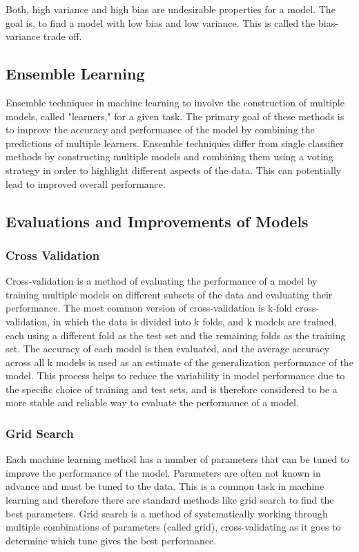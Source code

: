 Both, high variance and high bias are undesirable properties for a model. The goal is, to find a
model with low bias and low variance. This is called the bias-variance trade off. \cite[p.
9]{neal_biasvariancetradeofftextbooks_2019}

\subsection{Ensemble Learning}
Ensemble techniques in machine learning to involve the construction of multiple models, called
"learners," for a given task. The primary goal of these methods is to improve the accuracy and
performance of the model by combining the predictions of multiple learners. Ensemble techniques
differ from single classifier methods by constructing multiple models and combining them using a
voting strategy in order to highlight different aspects of the data. This can potentially lead to
improved overall performance. \cite[p. 253]{shaik_briefsurveyrandom_2019}

\subsection{Evaluations and Improvements of Models}

\subsubsection{Cross Validation}
Cross-validation is a method of evaluating the performance of a model by training multiple models
on different subsets of the data and evaluating their performance. The most common version of
cross-validation is k-fold cross-validation, in which the data is divided into k folds, and k
models are trained, each using a different fold as the test set and the remaining folds as the
training set.
The accuracy of each model is then evaluated, and the average accuracy across all k models is
used as an estimate of the generalization performance of the model. This process helps to reduce
the variability in model performance due to the specific choice of training and test sets, and is
therefore considered to be a more stable and reliable way to evaluate the performance of a model.
\cite[p. 252-260]{muller_introductionmachinelearning_2016}

\subsubsection{Grid Search}
Each machine learning method has a number of parameters that can be tuned to improve the
performance of the model. Parameters are often not known in advance and must be tuned to the data.
This is a common task in machine learning and therefore there are standard methods like grid
search to find the best parameters.
Grid search is a method of systematically working through multiple combinations of parameters
(called grid), cross-validating as it goes to determine which tune gives the best performance.
\cite[p. 260-275]{muller_introductionmachinelearning_2016}


